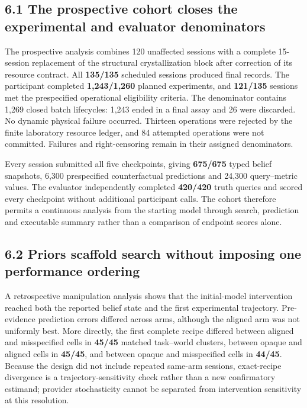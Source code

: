 \documentclass[10pt,twocolumn]{article}
\begin{document}
\subsection{6.1 The prospective cohort closes the experimental and
evaluator
denominators}\label{the-prospective-cohort-closes-the-experimental-and-evaluator-denominators}

The prospective analysis combines 120 unaffected sessions with a
complete 15-session replacement of the structural crystallization block
after correction of its resource contract. All \textbf{135/135}
scheduled sessions produced final records. The participant completed
\textbf{1,243/1,260} planned experiments, and \textbf{121/135} sessions
met the prespecified operational eligibility criteria. The denominator
contains 1,269 closed batch lifecycles: 1,243 ended in a final assay and
26 were discarded. No dynamic physical failure occurred. Thirteen
operations were rejected by the finite laboratory resource ledger, and
84 attempted operations were not committed. Failures and right-censoring
remain in their assigned denominators.

Every session submitted all five checkpoints, giving \textbf{675/675}
typed belief snapshots, 6,300 prespecified counterfactual predictions
and 24,300 query--metric values. The evaluator independently completed
\textbf{420/420} truth queries and scored every checkpoint without
additional participant calls. The cohort therefore permits a continuous
analysis from the starting model through search, prediction and
executable summary rather than a comparison of endpoint scores alone.

\subsection{6.2 Priors scaffold search without imposing one performance
ordering}\label{priors-scaffold-search-without-imposing-one-performance-ordering}

A retrospective manipulation analysis shows that the initial-model
intervention reached both the reported belief state and the first
experimental trajectory. Pre-evidence prediction errors differed across
arms, although the aligned arm was not uniformly best. More directly,
the first complete recipe differed between aligned and misspecified
cells in \textbf{45/45} matched task--world clusters, between opaque and
aligned cells in \textbf{45/45}, and between opaque and misspecified
cells in \textbf{44/45}. Because the design did not include repeated
same-arm sessions, exact-recipe divergence is a trajectory-sensitivity
check rather than a new confirmatory estimand; provider stochasticity
cannot be separated from intervention sensitivity at this resolution.
\end{document}
